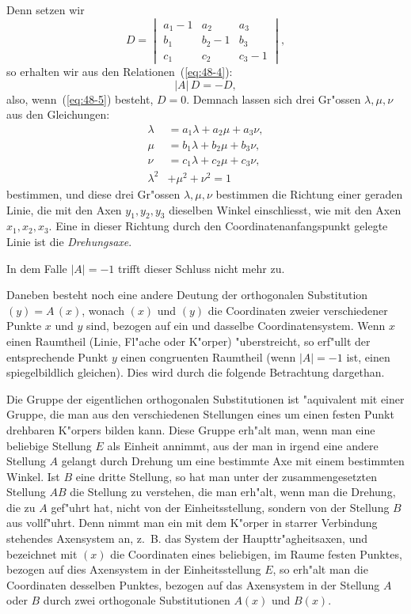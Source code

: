 \documentclass[12pt,a4paper]{article}
\theoremstyle{definition}
\begin{document}
Denn setzen wir
\[
D = \begin{vmatrix}
a_1 - 1 & a_2 & a_3 \\
b_1 & b_2 - 1 & b_3 \\
c_1 & c_2 & c_3 - 1
\end{vmatrix},
\]
so erhalten wir aus den Relationen~(\ref{eq:48-4}):
\[
|A|\,D = -D,
\]
also, wenn~(\ref{eq:48-5}) besteht, $D = 0$. Demnach lassen sich drei Gr"ossen $\lambda, \mu, \nu$ aus den Gleichungen:
\begin{equation}\label{eq:48-6}
\begin{aligned}
\lambda &= a_1\lambda + a_2\mu + a_3\nu, \\
\mu &= b_1\lambda + b_2\mu + b_3\nu, \\
\nu &= c_1\lambda + c_2\mu + c_3\nu, \\
\lambda^2 &+ \mu^2 + \nu^2 = 1
\end{aligned}
\end{equation}
bestimmen, und diese drei Gr"ossen $\lambda, \mu, \nu$ bestimmen die Richtung einer geraden Linie, die mit den Axen $y_1, y_2, y_3$ dieselben Winkel einschliesst, wie mit den Axen $x_1, x_2, x_3$. Eine in dieser Richtung durch den Coordinatenanfangspunkt gelegte Linie ist die \emph{Drehungsaxe}.

In dem Falle $|A| = -1$ trifft dieser Schluss nicht mehr zu.

Daneben besteht noch eine andere Deutung der orthogonalen Substitution $(y) = A\,(x)$, wonach $(x)$ und $(y)$ die Coordinaten zweier verschiedener Punkte $x$ und $y$ sind, bezogen auf ein und dasselbe Coordinatensystem. Wenn $x$ einen Raumtheil (Linie, Fl"ache oder K"orper) "uberstreicht, so erf"ullt der entsprechende Punkt $y$ einen congruenten Raumtheil (wenn $|A| = -1$ ist, einen spiegelbildlich gleichen). Dies wird durch die folgende Betrachtung dargethan.

Die Gruppe der eigentlichen orthogonalen Substitutionen ist "aquivalent mit einer Gruppe, die man aus den verschiedenen Stellungen eines um einen festen Punkt drehbaren K"orpers bilden kann. Diese Gruppe erh"alt man, wenn man eine beliebige Stellung $E$ als Einheit annimmt, aus der man in irgend eine andere Stellung $A$ gelangt durch Drehung um eine bestimmte Axe mit einem bestimmten Winkel. Ist $B$ eine dritte Stellung, so hat man unter der zusammengesetzten Stellung $AB$ die Stellung zu verstehen, die man erh"alt, wenn man die Drehung, die zu $A$ gef"uhrt hat, nicht von der Einheitsstellung, sondern von der Stellung $B$ aus vollf"uhrt. Denn nimmt man ein mit dem K"orper in starrer Verbindung stehendes Axensystem an, z.~B. das System der Haupttr"agheitsaxen, und bezeichnet mit $(x)$ die Coordinaten eines beliebigen, im Raume festen Punktes, bezogen auf dies Axensystem in der Einheitsstellung $E$, so erh"alt man die Coordinaten desselben Punktes, bezogen auf das Axensystem in der Stellung $A$ oder $B$ durch zwei orthogonale Substitutionen $A(x)$ und $B(x)$.
\end{document}
